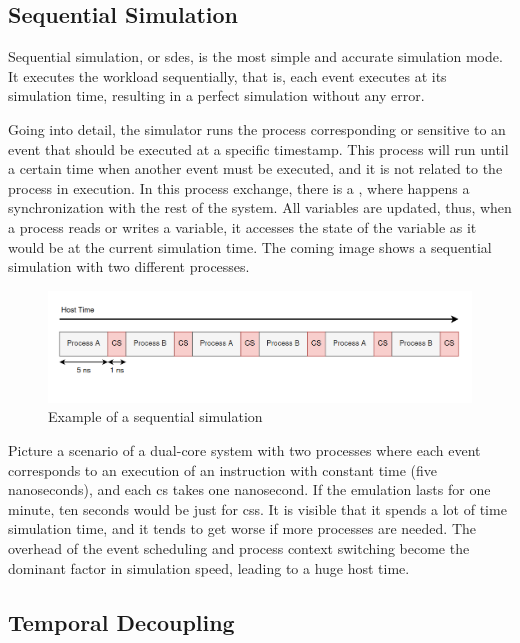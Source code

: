 \subsection{Sequential Simulation}

Sequential simulation, or \gls{sdes}, is the most simple and accurate simulation mode. It executes the workload sequentially, that is, each event 
executes at its simulation time, resulting in a perfect simulation without any error. 

Going into detail, the simulator runs the process corresponding or sensitive to an event that should be executed at a specific timestamp. This 
process will run until a certain time when another event must be executed, and it is not related to the process in execution. In this process 
exchange, there is a , where happens a synchronization with the rest of the system. All variables are updated, thus, when a 
process reads or writes a variable, it accesses the state of the variable as it would be at the current simulation time. The coming image shows 
a sequential simulation with two different processes.

\begin{figure}[H]
	\centering
 	\includegraphics[width=0.8\linewidth]{Images/SequentialSimulation.png}
 	\caption{Example of a sequential simulation}
	 \label{fig_SequentialSimulation}
\end{figure}

Picture a scenario of a dual-core system with two processes where each event corresponds to an execution of an instruction with constant 
time (five nanoseconds), and each \gls{cs} takes one nanosecond. If the emulation lasts for one minute, ten seconds would be just for \glspl{cs}. 
It is visible that it spends a lot of time simulation time, and it tends to get worse if more processes are needed. The overhead of the event 
scheduling and process context switching become the dominant factor in simulation speed, leading to a huge host time.

\subsection{Temporal Decoupling}

